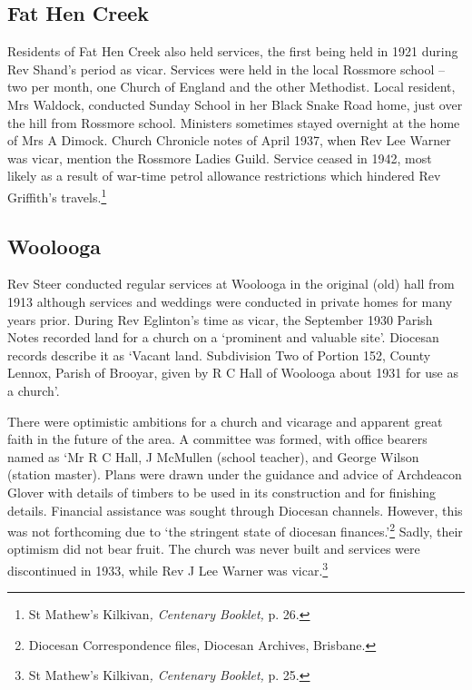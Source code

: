\hypertarget{fat-hen-creek}{%
\subsection{Fat Hen Creek}\label{fat-hen-creek}}

Residents of Fat Hen Creek also held services, the first being held in 1921 during Rev Shand's period as vicar. Services were held in the local Rossmore school -- two per month, one Church of England and the other Methodist. Local resident, Mrs Waldock, conducted Sunday School in her Black Snake Road home, just over the hill from Rossmore school. Ministers sometimes stayed overnight at the home of Mrs A Dimock. Church Chronicle notes of April 1937, when Rev Lee Warner was vicar, mention the Rossmore Ladies Guild. Service ceased in 1942, most likely as a result of war-time petrol allowance restrictions which hindered Rev Griffith's travels.\footnote{St Mathew's Kilkivan\emph{, Centenary Booklet,} p. 26.}

\hypertarget{woolooga}{%
\subsection{Woolooga}\label{woolooga}}

Rev Steer conducted regular services at Woolooga in the original (old) hall from 1913 although services and weddings were conducted in private homes for many years prior. During Rev Eglinton's time as vicar, the September 1930 Parish Notes recorded land for a church on a `prominent and valuable site'. Diocesan records describe it as `Vacant land. Subdivision Two of Portion 152, County Lennox, Parish of Brooyar, given by R C Hall of Woolooga about 1931 for use as a church'.

There were optimistic ambitions for a church and vicarage and apparent great faith in the future of the area. A committee was formed, with office bearers named as `Mr R C Hall, J McMullen (school teacher), and George Wilson (station master). Plans were drawn under the guidance and advice of Archdeacon Glover with details of timbers to be used in its construction and for finishing details. Financial assistance was sought through Diocesan channels. However, this was not forthcoming due to `the stringent state of diocesan finances.'\footnote{Diocesan Correspondence files, Diocesan Archives, Brisbane.} Sadly, their optimism did not bear fruit. The church was never built and services were discontinued in 1933, while Rev J Lee Warner was vicar.\footnote{St Mathew's Kilkivan\emph{, Centenary Booklet,} p. 25.}

